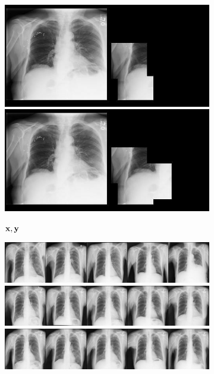 \begin{figure}[t]
\begin{subfigure}[t]{0.16\textwidth}
    \includegraphics[height=\xrayimgheight]{figs/cigcvae/image-samples/xray/x_y_5.jpg}
    \includegraphics[height=\xrayimgheight]{figs/cigcvae/image-samples/xray/x_y_6.jpg}
    \caption{${\mathbf{x}}, {\mathbf{y}}$}
  \end{subfigure}
  \begin{subfigure}[t]{0.4\textwidth}
    \centering
    \includegraphics[height=\xrayimgheight]{figs/cigcvae/image-samples/xray/ipa_1.jpg}
    \includegraphics[height=\xrayimgheight]{figs/cigcvae/image-samples/xray/ipa_2.jpg}
    \includegraphics[height=\xrayimgheight]{figs/cigcvae/image-samples/xray/ipa_3.jpg}

\end{subfigure}
\end{figure}

